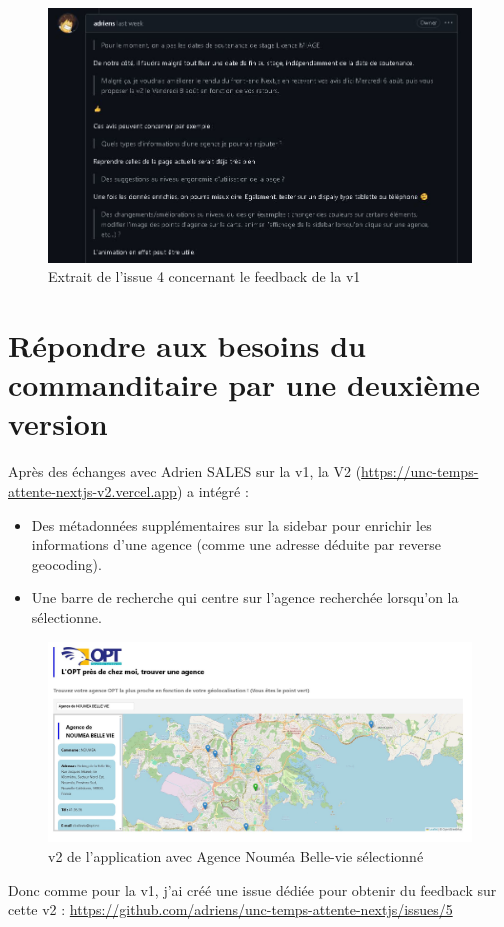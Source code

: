 \documentclass[12pt,a4paper]{report}
\begin{document}
\begin{figure}[h] %
    \centering
    \includegraphics[width=1\textwidth]{ressources_rapport/extrait_issue_4.JPG}
    \caption{Extrait de l'issue 4 concernant le feedback de la v1}
\end{figure}
\newpage

\section{Répondre aux besoins du commanditaire par une deuxième version}
Après des échanges avec Adrien SALES sur la v1, la V2 (\href{https://unc-temps-attente-nextjs-v2.vercel.app}{https://unc-temps-attente-nextjs-v2.vercel.app}) a intégré :
\begin{itemize}
    \item Des métadonnées supplémentaires sur la sidebar pour enrichir les informations d'une agence (comme une adresse déduite par reverse geocoding).
    \item Une barre de recherche qui centre sur l'agence recherchée lorsqu'on la sélectionne.
\end{itemize}

\begin{figure}[h] %
    \centering
    \includegraphics[width=1\textwidth]{ressources_rapport/app_opt_v2.JPG}
    \caption{v2 de l'application avec Agence Nouméa Belle-vie sélectionné}
\end{figure}
\vspace{8cm}
Donc comme pour la v1, j'ai créé une issue dédiée pour obtenir du feedback sur cette v2 : \href{https://github.com/adriens/unc-temps-attente-nextjs/issues/5}{https://github.com/adriens/unc-temps-attente-nextjs/issues/5}
\end{document}

